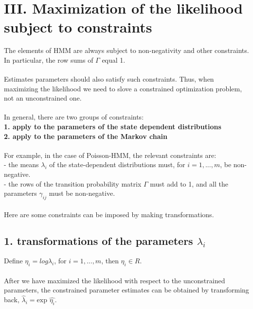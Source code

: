 \documentclass{article}
\begin{document}
\section*{III. Maximization of the likelihood subject to constraints}

The elements of HMM are always subject to non-negativity and other constraints. In particular, the row sums of $\Gamma$ equal 1. \\
\\
Estimates parameters should also satisfy such constraints. Thus, when maximizing the likelihood we need to slove a constrained optimization problem, not an unconstrained one. \\
\\
In general, there are two groups of constraints: \\
\textbf{1. apply to the parameters of the state dependent distributions} \\
\textbf{2. apply to the parameters of the Markov chain} \\
\\
For example, in the case of Poisson-HMM, the relevant constraints are: \\
- the means $\lambda_i$ of the state-dependent distributions must, for $i = 1, ..., m$, be non-negative. \\
- the rows of the transition probability matrix $\Gamma$ must add to 1, and all the parameters $\gamma_{ij}$ must be non-negative. \\
\\
Here are some constraints can be imposed by making transformations.

\subsection*{1. transformations of the parameters $\lambda_i$}
Define $\eta_i = log \lambda_i$, for $i = 1, ..., m$, then $\eta_i \in R$. \\ 
\\
After we have maximized the likelihood with respect to the unconstrained parameters, the constrained parameter estimates can be obtained by transforming back, $\hat{\lambda}_i = \text{exp } \hat{\eta_i}$.
\end{document}
